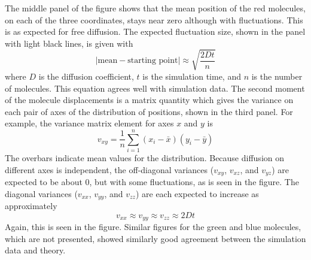 \documentclass {scrbook}
\begin{document}
The middle panel of the figure shows that the mean position of the red molecules, on each of the three coordinates, stays near zero although with fluctuations. This is as expected for free diffusion. The expected fluctuation size, shown in the panel with light black lines, is given with
$$|\textrm{mean}-\textrm{starting point}| \approx \sqrt{\frac{2Dt}{n}}$$
where $D$ is the diffusion coefficient, $t$ is the simulation time, and $n$ is the number of molecules. This equation agrees well with simulation data. The second moment of the molecule displacements is a matrix quantity which gives the variance on each pair of axes of the distribution of positions, shown in the third panel. For example, the variance matrix element for axes $x$ and $y$ is
$$v_{xy} = \frac{1}{n} \sum_{i=1}^{n} (x_i - \bar{x})(y_i - \bar{y})$$
The overbars indicate mean values for the distribution. Because diffusion on different axes is independent, the off-diagonal variances ($v_{xy}$, $v_{xz}$, and $v_{yz}$) are expected to be about 0, but with some fluctuations, as is seen in the figure. The diagonal variances ($v_{xx}$, $v_{yy}$, and $v_{zz}$) are each expected to increase as approximately
$$v_{xx} \approx v_{yy} \approx v_{zz} \approx 2Dt$$
Again, this is seen in the figure. Similar figures for the green and blue molecules, which are not presented, showed similarly good agreement between the simulation data and theory.
\end{document}
